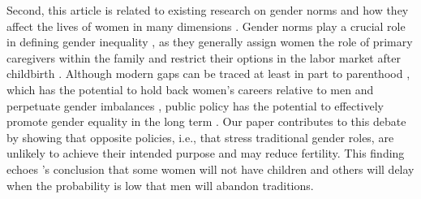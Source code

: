 \documentclass[a4paper,oneside,final,onecolumn,12pt,english]{article}
\begin{document}
Second, this article is related to existing research on gender norms and how they affect the lives of women in many dimensions \citep{bertrand2015gender, fortin2015gender, gousse2017marriage, andresen2019causes, grewenig2020gender, olivetti2020mothers, cortes2023children, boelmann2025wind}. Gender norms play a crucial role in defining gender inequality \citep{kleven2019child, bertrand2020gender, ashraf2022gender, bursztyn2023gender, farre2023changing}, as they generally assign women the role of primary caregivers within the family and restrict their options in the labor market after childbirth \citep{bertrand2015gender, fortin2015gender, gousse2017marriage, andresen2019causes, grewenig2020gender, olivetti2020mothers, cortes2023children, boelmann2025wind}. Although modern gaps can be traced at least in part to parenthood \citep{fernandez2004mothers, alesina2013origins, farre2013intergenerational}, which has the potential to hold back women’s careers relative to men \citep{daniel2013motherhood, angelov2016parenthood, kleven2019children, bertrand2020gender, cortes2023children} and perpetuate gender imbalances \citep{albanesi2023families, kleven2024family}, public policy has the potential to effectively promote gender equality in the long term \citep{hara2021long, farre2023changing}. Our paper contributes to this debate by showing that opposite policies, i.e., that stress traditional gender roles, are unlikely to achieve their intended purpose and may reduce fertility. This finding echoes \citet{goldin2025downside}'s conclusion that some women will not have children and others will delay when the probability is low that men will abandon traditions.
\end{document}
